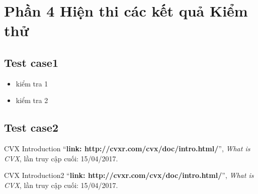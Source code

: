 \documentclass[a4paper]{article}
\begin{document}
 \section{Phần 4 Hiện thi các kết quả Kiểm thử}
    \subsection{Test case1}
    \begin{itemize}
         \item kiểm tra 1
        \item  kiểm tra 2
    \end{itemize}
       

    \subsection{Test case2}
   

\begin{thebibliography}{80}

CVX Introduction
``\textbf{link: http://cvxr.com/cvx/doc/intro.html/}'',
\textit{What is CVX}, lần truy cập cuối: 15/04/2017.

CVX Introduction2
``\textbf{link: http://cvxr.com/cvx/doc/intro.html/}'',
\textit{What is CVX}, lần truy cập cuối: 15/04/2017.

\end{thebibliography}
\end{document}
